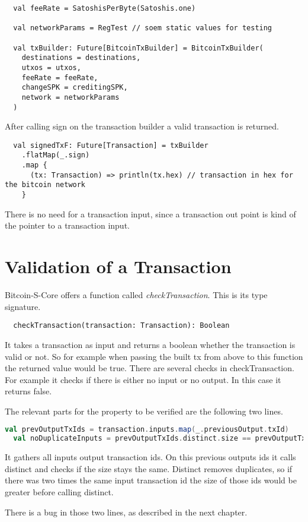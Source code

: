 \begin{lstlisting}
  val feeRate = SatoshisPerByte(Satoshis.one)

  val networkParams = RegTest // soem static values for testing

  val txBuilder: Future[BitcoinTxBuilder] = BitcoinTxBuilder(
    destinations = destinations,
    utxos = utxos,
    feeRate = feeRate,
    changeSPK = creditingSPK,
    network = networkParams
  )
\end{lstlisting}
After calling sign on the transaction builder a valid transaction is returned.
\begin{lstlisting}
  val signedTxF: Future[Transaction] = txBuilder
    .flatMap(_.sign)
    .map {
      (tx: Transaction) => println(tx.hex) // transaction in hex for the bitcoin network
    }
\end{lstlisting}
There is no need for a transaction input, since a transaction out point is kind of the pointer to a transaction input.

\section{Validation of a Transaction}
Bitcoin-S-Core offers a function called \emph{checkTransaction}.
This is its type signature.
\begin{lstlisting}
  checkTransaction(transaction: Transaction): Boolean
\end{lstlisting}
It takes a transaction as input and returns a boolean whether the transaction is valid or not.
So for example when passing the built tx from above to this function the returned value would be true.
There are several checks in checkTransaction.
For example it checks if there is either no input or no output.
In this case it returns false.

The relevant parts for the property to be verified are the following two lines.
\begin{lstlisting}[language=scala]
  val prevOutputTxIds = transaction.inputs.map(_.previousOutput.txId)
  val noDuplicateInputs = prevOutputTxIds.distinct.size == prevOutputTxIds.size
\end{lstlisting}
It gathers all inputs output transaction ids.
On this previous outputs ids it calls distinct and checks if the size stays the same.
Distinct removes duplicates, so if there was two times the same input transaction id the size of those ids would be greater before calling distinct.

There is a bug in those two lines, as described in the next chapter.
